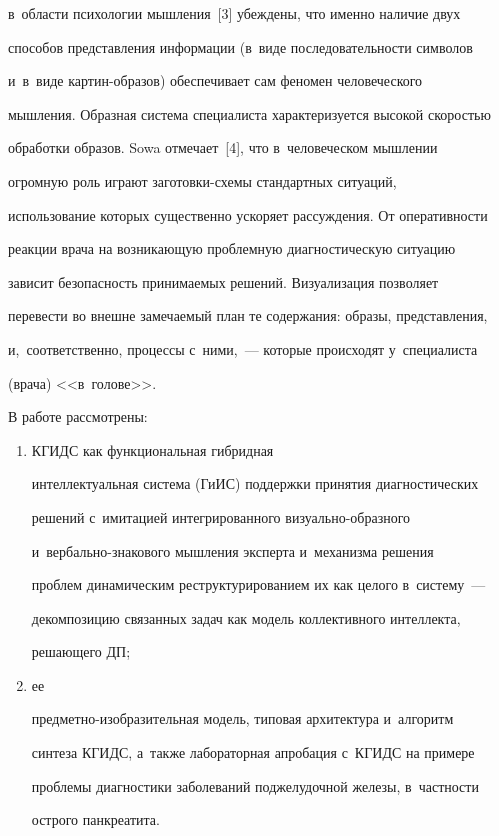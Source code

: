 в~об\-ласти психологии мыш\-ле\-ния~[3] убеждены, что именно наличие двух 

способов пред\-став\-ле\-ния информации (в~виде по\-сле\-до\-ва\-тель\-ности символов 

и~в~виде кар\-тин-об\-ра\-зов) обеспечивает сам феномен человеческого 

мыш\-ле\-ния. Образная система специалиста характеризуется высокой ско\-ростью 

обработки образов. Sowa отмечает~[4], что в~человеческом мыш\-ле\-нии 

огромную роль играют за\-го\-тов\-ки-схе\-мы стандартных ситуаций, 

использование которых существенно ускоряет рассуждения. От оперативности 

реакции врача на возникающую проб\-лем\-ную диагностическую ситуацию 

зависит безопас\-ность принимаемых решений. Визуализация позволяет 

перевести во внеш\-не за\-ме\-ча\-емый план те содержания: образы, пред\-став\-ле\-ния, 

и,~соответственно, процессы с~ними,~--- которые происходят у~специалиста 

(врача) <<в~голове>>. 

  

  В работе рассмотрены:

  \begin{enumerate}[(1)]

  \item КГИДС как функциональная гибридная 

интеллектуальная сис\-те\-ма (ГиИС) поддержки принятия диагностических 

решений с~имитацией интегрированного ви\-зу\-аль\-но-об\-раз\-но\-го  

и~вер\-баль\-но-зна\-ко\-во\-го мыш\-ле\-ния эксперта и~механизма решения  

проб\-лем динамическим реструктурированием их как целого в~сис\-те\-му~--- 

декомпозицию связанных задач как модель коллективного интеллекта, 

ре\-ша\-юще\-го ДП; 

\item ее  

пред\-мет\-но-изоб\-ра\-зи\-тель\-ная модель, типовая архитектура и~алгоритм 

синтеза \mbox{КГИДС}, а~также лабораторная апробация с~\mbox{КГИДС} на примере 

проблемы диагностики заболеваний поджелудочной железы, в~част\-ности 

острого панкреатита.

\end{enumerate}



